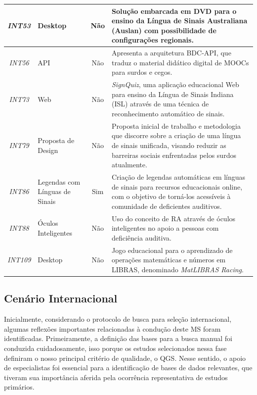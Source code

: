 \begin{small}
\begin{longtable}{c|>{\centering\arraybackslash}p{2.75cm}|c|p{10cm}}
\textit{INT53} & Desktop & Não & Solução embarcada em DVD para o ensino da Língua de Sinais Australiana (Auslan) com possibilidade de configurações regionais. \\ \hline
\textit{INT56} & API & Não & Apresenta a arquitetura BDC-API, que traduz o material didático digital de MOOCs para surdos e cegos. \\ \hline
\textit{INT73} & Web & Não & \textit{SignQuiz}, uma aplicação educacional Web para ensino da Língua de Sinais Indiana (ISL) através de uma técnica de reconhecimento automático de sinais. \\ \hline
\textit{INT79} & Proposta de Design & Não & Proposta inicial de trabalho e metodologia que discorre sobre a criação de uma língua de sinais unificada, visando reduzir as barreiras sociais enfrentadas pelos surdos atualmente. \\ \hline
\textit{INT86} & Legendas com Línguas de Sinais & Sim & Criação de legendas automáticas em línguas de sinais para recursos educacionais online, com o objetivo de torná-los acessíveis à comunidade de deficientes auditivos. \\ \hline
\textit{INT88} & Óculos Inteligentes & Não & Uso do conceito de RA através de óculos inteligentes no apoio a pessoas com deficiência auditiva. \\ \hline
\textit{INT109} & Desktop & Não & Jogo educacional para o aprendizado de operações matemáticas e números em LIBRAS, denominado \textit{MatLIBRAS Racing}. \\ \hline
\end{longtable}
\end{small}

\subsection{Cenário Internacional}
\label{ms:cenario-internacional}

Inicialmente, considerando o protocolo de busca para seleção internacional, algumas reflexões importantes relacionadas à condução deste MS foram identificadas. Primeiramente, a definição das bases para a busca manual foi conduzida cuidadosamente, isso porque os estudos selecionados nessa fase definiram o nosso principal critério de qualidade, o QGS. Nesse sentido, o apoio de especialistas foi essencial para a identificação de bases de dados relevantes, que tiveram sua importância aferida pela ocorrência representativa de estudos primários.

